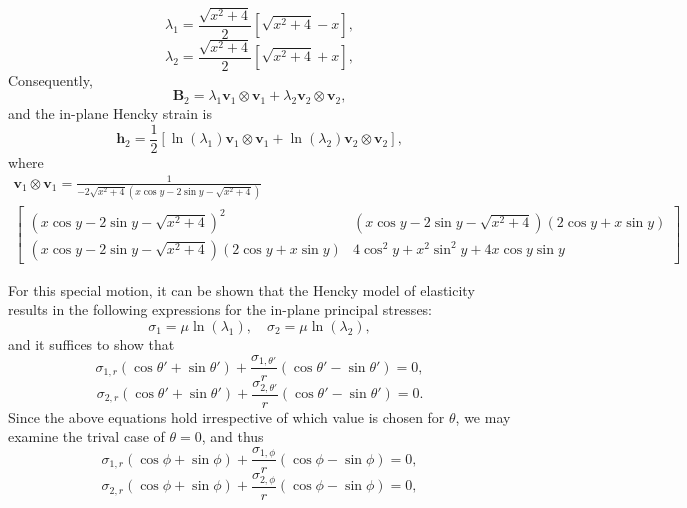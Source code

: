 \documentclass[12pt]{article}
\begin{document}
\begin{equation}
	\lambda_1 = \frac{\sqrt{x^2 + 4}}{2} \left[ \sqrt{x^2 + 4} - x \right],
\end{equation}
\begin{equation}
	\lambda_2 = \frac{\sqrt{x^2 + 4}}{2} \left[ \sqrt{x^2 + 4} + x \right],
\end{equation}
Consequently,
\begin{equation}
	\mathbf{B}_2 = \lambda_1 \mathbf{v}_1 \otimes \mathbf{v}_1 + \lambda_2 \mathbf{v}_2 \otimes \mathbf{v}_2,
\end{equation}
and the in-plane Hencky strain is
\begin{equation}
	\mathbf{h}_2 = \frac{1}{2} \left[ \ln (\lambda_1) \mathbf{v}_1 \otimes \mathbf{v}_1 + \ln (\lambda_2) \mathbf{v}_2 \otimes \mathbf{v}_2 \right],
\end{equation}
where
\begin{eqnarray}
	\mathbf{v}_1 \otimes \mathbf{v}_1 = \frac{1}{- 2 \sqrt{x^2+4} (x \cos y - 2 \sin y - \sqrt{x^2+4})} \\
	 \left[ \begin{array}{cc} (x \cos y - 2 \sin y - \sqrt{x^2 + 4})^2 &
	 (x \cos y - 2 \sin y - \sqrt{x^2 + 4})(2 \cos y + x \sin y) \\ 
	 (x \cos y - 2 \sin y - \sqrt{x^2 + 4})(2 \cos y + x \sin y) &
	 4 \cos^2 y + x^2 \sin^2 y + 4 x \cos y \sin y \end{array} \right]
\end{eqnarray}

For this special motion, it can be shown that the Hencky model of elasticity results in the following expressions for the in-plane principal stresses:
\begin{equation}
	\sigma_1 = \mu \ln (\lambda_1), \quad \sigma_2 = \mu \ln (\lambda_2),
\end{equation}
and it suffices to show that
\begin{equation}
	\sigma_{1,r} (\cos \theta' + \sin \theta') + \frac{\sigma_{1,\theta'}}{r} (\cos \theta' - \sin \theta') = 0,
\end{equation}
\begin{equation}
	\sigma_{2,r} (\cos \theta' + \sin \theta') + \frac{\sigma_{2,\theta'}}{r} (\cos \theta' - \sin \theta') = 0.
\end{equation}
Since the above equations hold irrespective of which value is chosen for $\theta$, we may examine the trival case of $\theta = 0$, and thus
\begin{equation}
	\sigma_{1,r} (\cos \phi + \sin \phi) + \frac{\sigma_{1,\phi}}{r} (\cos \phi - \sin \phi) = 0,
\end{equation}
\begin{equation}
	\sigma_{2,r} (\cos \phi + \sin \phi) + \frac{\sigma_{2,\phi}}{r} (\cos \phi - \sin \phi) = 0,
\end{equation}
\end{document}
